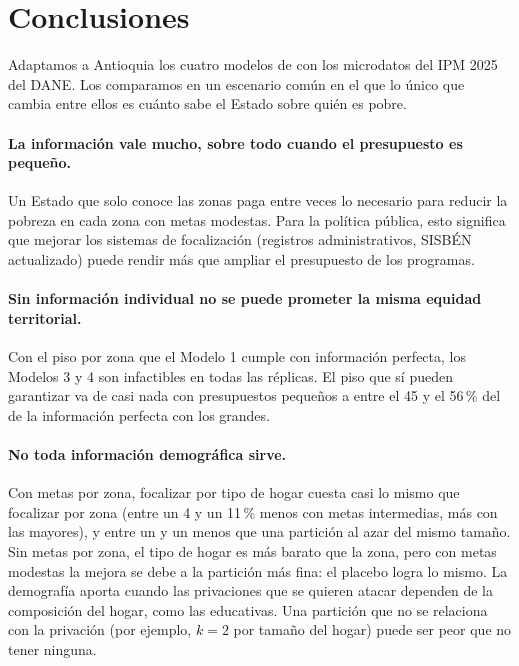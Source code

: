 \section{Conclusiones}\label{sec:conclusiones}

Adaptamos a Antioquia los cuatro modelos de \citet{hamie2024} con los microdatos
del IPM 2025 del DANE. Los comparamos en un escenario común en el que lo único que
cambia entre ellos es cuánto sabe el Estado sobre quién es pobre.


\paragraph{La información vale mucho, sobre todo cuando el presupuesto es
pequeño.} Un Estado que solo conoce las zonas paga entre \zMtresIPbaja{} veces lo
necesario para reducir la pobreza en cada zona con metas modestas. Para la política pública, esto significa
que mejorar los sistemas de focalización (registros administrativos, SISBÉN
actualizado) puede rendir más que ampliar el presupuesto de los programas.

\paragraph{Sin información individual no se puede prometer la misma equidad
territorial.} Con el piso por zona que el Modelo 1 cumple con información
perfecta, los Modelos 3 y 4 son infactibles en todas las réplicas. El piso que sí
pueden garantizar va de casi nada con presupuestos pequeños a entre el 45 y el
56\,\% del de la información perfecta con los grandes.

\paragraph{No toda información demográfica sirve.} Con metas por zona, focalizar
por tipo de hogar cuesta casi lo mismo que focalizar por zona (entre un 4 y un
11\,\% menos con metas intermedias, más con las mayores), y entre un \zPlacMin{} y un
\zPlacMax{} menos que una partición al azar del mismo tamaño. Sin metas por
zona, el tipo de hogar es más barato que la zona, pero con metas modestas la
mejora se debe a la partición más fina: el placebo logra lo mismo. La
demografía aporta cuando las privaciones que se quieren atacar dependen de la
composición del hogar, como las educativas. Una partición que no se relaciona con
la privación (por ejemplo, $k=2$ por tamaño del hogar) puede ser peor que no
tener ninguna.

